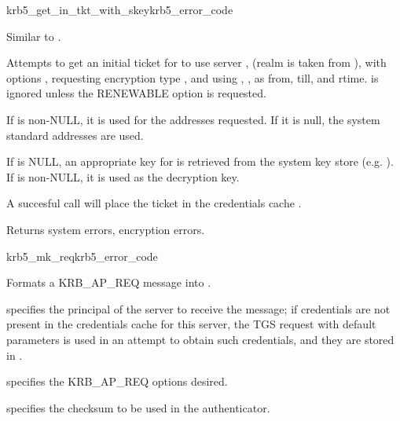 \begin{funcdecl}{krb5_get_in_tkt_with_skey}{krb5_error_code}{\funcin}
\funcinout
{}
\end{funcdecl}
Similar to .

Attempts to get an initial ticket for  to use server
, (realm is taken from
), with options , requesting
encryption type , and using 
, ,
 as from, till, and rtime.
 is ignored unless the
RENEWABLE option is requested.

If  is non-NULL, it is used for the addresses
requested.  If it is null, the system standard addresses are used.

If  is NULL, an appropriate key for
 is retrieved from the system key store (e.g.
).  If  is non-NULL, it is
used as the decryption key.

A succesful call will place the ticket in the credentials cache
.

Returns system errors, encryption errors.

\begin{funcdecl}{krb5_mk_req}{krb5_error_code}{\funcin}
\funcout
{}
\end{funcdecl}

Formats a KRB_AP_REQ message into .

 specifies the principal of the server to receive the
message; if credentials are not present in the credentials cache
 for this server, the TGS request with default
parameters is used in an attempt to obtain such credentials, and they
are stored in .

 specifies the KRB_AP_REQ options desired.

 specifies the checksum to be used in the authenticator.

